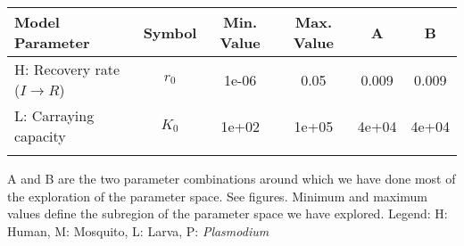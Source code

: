 \begin{table}
\noindent
\begin{tabular}{p{5cm}ccccc}
{\bf Model Parameter} & {\bf Symbol} & {\bf Min. Value} & {\bf Max. Value} & {\bf A} & {\bf B}\\
\hline\hline
  H: Recovery rate ($I \rightarrow R$) & $r_0$ & 1e-06 & 0.05 & 0.009 & 0.009\\
  L: Carraying capacity & $K_0$ & 1e+02 & 1e+05 & 4e+04 & 4e+04\\
\hline\hline
\smallskip
\end{tabular}
 A and B are the two parameter combinations around which we have done most of the exploration of the parameter space. See figures. Minimum and maximum values define the subregion of the parameter space we have explored. Legend: {\small H: Human, M: Mosquito, L: Larva, P: {\em Plasmodium}} 
\end{table}
